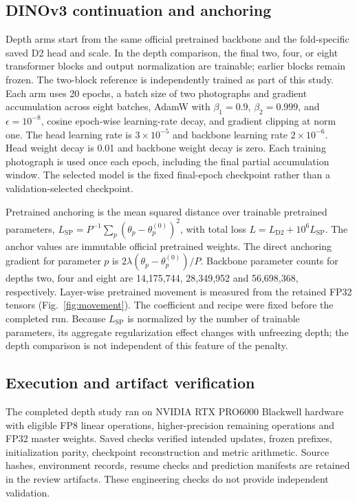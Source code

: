 \documentclass[pdflatex,a4paper,sn-nature]{sn-jnl}
\begin{document}
\subsection{DINOv3 continuation and anchoring}
Depth arms start from the same official pretrained backbone and the fold-specific saved D2 head and scale. In the depth comparison, the final two, four, or eight transformer blocks and output normalization are trainable; earlier blocks remain frozen. The two-block reference is independently trained as part of this study. Each arm uses 20 epochs, a batch size of two photographs and gradient accumulation across eight batches, AdamW with $\beta_1=0.9$, $\beta_2=0.999$, and $\epsilon=10^{-8}$, cosine epoch-wise learning-rate decay, and gradient clipping at norm one. The head learning rate is $3\times10^{-5}$ and backbone learning rate $2\times10^{-6}$. Head weight decay is 0.01 and backbone weight decay is zero. Each training photograph is used once each epoch, including the final partial accumulation window. The selected model is the fixed final-epoch checkpoint rather than a validation-selected checkpoint.

Pretrained anchoring is the mean squared distance over trainable pretrained parameters, $L_{\mathrm{SP}}=P^{-1}\sum_p(\theta_p-\theta_p^{(0)})^2$, with total loss $L=L_{\mathrm{D2}}+10^6L_{\mathrm{SP}}$. The anchor values are immutable official pretrained weights. The direct anchoring gradient for parameter $p$ is $2\lambda(\theta_p-\theta_p^{(0)})/P$. Backbone parameter counts for depths two, four and eight are 14,175,744, 28,349,952 and 56,698,368, respectively. Layer-wise pretrained movement is measured from the retained FP32 tensors (Fig.~\ref{fig:movement}). The coefficient and recipe were fixed before the completed run. Because $L_{\mathrm{SP}}$ is normalized by the number of trainable parameters, its aggregate regularization effect changes with unfreezing depth; the depth comparison is not independent of this feature of the penalty.

\subsection{Execution and artifact verification}
The completed depth study ran on NVIDIA RTX PRO6000 Blackwell hardware with eligible FP8 linear operations, higher-precision remaining operations and FP32 master weights. Saved checks verified intended updates, frozen prefixes, initialization parity, checkpoint reconstruction and metric arithmetic. Source hashes, environment records, resume checks and prediction manifests are retained in the review artifacts. These engineering checks do not provide independent validation.
\end{document}
